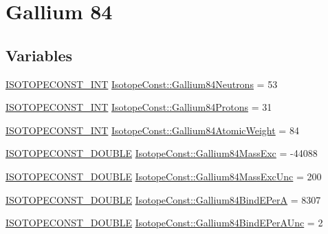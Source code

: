 \hypertarget{group___isotope_const-_gallium-_ga84}{}\section{Gallium 84}
\label{group___isotope_const-_gallium-_ga84}
\subsection*{Variables}
\begin{DoxyCompactItemize}
\item 
\mbox{\hyperlink{group___isotope_const-_macros_ga5f18360b3e99483a35c32d789e62621c}{I\+S\+O\+T\+O\+P\+E\+C\+O\+N\+S\+T\+\_\+\+I\+NT}} \mbox{\hyperlink{group___isotope_const-_gallium-_ga84_gaf327654eb421de1fe529e24e2c1d740b}{Isotope\+Const\+::\+Gallium84\+Neutrons}} = 53
\item 
\mbox{\hyperlink{group___isotope_const-_macros_ga5f18360b3e99483a35c32d789e62621c}{I\+S\+O\+T\+O\+P\+E\+C\+O\+N\+S\+T\+\_\+\+I\+NT}} \mbox{\hyperlink{group___isotope_const-_gallium-_ga84_gae7420529c570c142fd28f229b4f91c4a}{Isotope\+Const\+::\+Gallium84\+Protons}} = 31
\item 
\mbox{\hyperlink{group___isotope_const-_macros_ga5f18360b3e99483a35c32d789e62621c}{I\+S\+O\+T\+O\+P\+E\+C\+O\+N\+S\+T\+\_\+\+I\+NT}} \mbox{\hyperlink{group___isotope_const-_gallium-_ga84_ga69b9a4f3e82572ac725a81cb566228ba}{Isotope\+Const\+::\+Gallium84\+Atomic\+Weight}} = 84
\item 
\mbox{\hyperlink{group___isotope_const-_macros_ga8f45a7272ce02c0b4c65c44636ed719a}{I\+S\+O\+T\+O\+P\+E\+C\+O\+N\+S\+T\+\_\+\+D\+O\+U\+B\+LE}} \mbox{\hyperlink{group___isotope_const-_gallium-_ga84_ga812c7d4076e6dd3125040154ca92b3f6}{Isotope\+Const\+::\+Gallium84\+Mass\+Exc}} = -\/44088
\item 
\mbox{\hyperlink{group___isotope_const-_macros_ga8f45a7272ce02c0b4c65c44636ed719a}{I\+S\+O\+T\+O\+P\+E\+C\+O\+N\+S\+T\+\_\+\+D\+O\+U\+B\+LE}} \mbox{\hyperlink{group___isotope_const-_gallium-_ga84_ga1ca1608048684c1acaa63358e9126b71}{Isotope\+Const\+::\+Gallium84\+Mass\+Exc\+Unc}} = 200
\item 
\mbox{\hyperlink{group___isotope_const-_macros_ga8f45a7272ce02c0b4c65c44636ed719a}{I\+S\+O\+T\+O\+P\+E\+C\+O\+N\+S\+T\+\_\+\+D\+O\+U\+B\+LE}} \mbox{\hyperlink{group___isotope_const-_gallium-_ga84_gace63b2c725638301ea2f9cb1376ff480}{Isotope\+Const\+::\+Gallium84\+Bind\+E\+PerA}} = 8307
\item 
\mbox{\hyperlink{group___isotope_const-_macros_ga8f45a7272ce02c0b4c65c44636ed719a}{I\+S\+O\+T\+O\+P\+E\+C\+O\+N\+S\+T\+\_\+\+D\+O\+U\+B\+LE}} \mbox{\hyperlink{group___isotope_const-_gallium-_ga84_gab913020ac712ef6029e2bbe713748817}{Isotope\+Const\+::\+Gallium84\+Bind\+E\+Per\+A\+Unc}} = 2

\end{DoxyCompactItemize}
